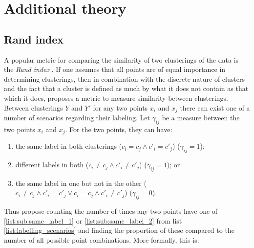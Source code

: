 \documentclass[12pt]{article} %
\begin{document}
	\newpage



%	
	
%	
	
%	
	
	

\newpage

\appendix

\section{Additional theory}

\subsection{Rand index} \label{sec:rand_index}
A popular metric for comparing the similarity of two clusterings of the data is the \emph{Rand index} \cite{RandObjectiveCriteriaEvaluation1971}. 	If one assumes that all points are of equal importance in determining clusterings, then in combination with the discrete nature of clusters and the fact that a cluster is defined as much by what it does not contain as that which it does, \citet{RandObjectiveCriteriaEvaluation1971} proposes a metric to measure similarity between clusterings. Between clusterings $Y$ and $Y'$ for any two points $x_i$ and $x_j$ there can exist one of a number of scenarios regarding their labeling. Let $\gamma_{ij}$ be a measure between the two points $x_i$ and $x_j$. For the two points, they can have:
\begin{enumerate} \label{list:labelling_scenarios}
	\item the same label in both clusterings ($c_i = c_j \land c'_i = c'_j$) ($\gamma_{ij}=1$); \label{list:sub:same_label_1}
	\item different labels in both ($c_i \neq c_j \land c'_i \neq c'_j$) ($\gamma_{ij}=1$); or \label{list:sub:same_label_2}
	\item the same label in one but not in the other ($c_i \neq c_j \land c'_i = c'_j \lor c_i = c_j \land c'_i \neq c'_j$) ($\gamma_{ij}=0$). \label{list:sub:different_label}
\end{enumerate}
Thus \citet{RandObjectiveCriteriaEvaluation1971} propose counting the number of times any two points have one of \ref{list:sub:same_label_1} or \ref{list:sub:same_label_2} from list \ref{list:labelling_scenarios} and finding the proportion of these compared to the number of all possible point combinations. More formally, this is:
\end{document}
